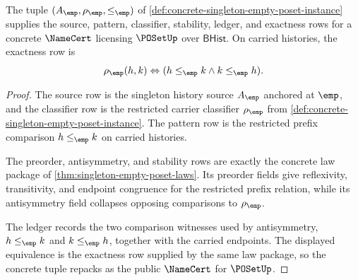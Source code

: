 \begin{theorem}
\label{thm:concrete-singleton-empty-poset-namecert}
The tuple $(A_{\emp},\rho_{\emp},\le_{\emp})$ of
\autoref{def:concrete-singleton-empty-poset-instance} supplies the source,
pattern, classifier, stability, ledger, and exactness rows for a concrete
$\NameCert$ licensing $\POSetUp$ over $\mathsf{BHist}$. On carried histories,
the exactness row is
$$
\rho_{\emp}(h,k)\Leftrightarrow(h\le_{\emp}k\land k\le_{\emp}h).
$$
\end{theorem}
\begin{proof}
The source row is the singleton history source $A_{\emp}$ anchored at $\emp$,
and the classifier row is the restricted carrier classifier $\rho_{\emp}$ from
\autoref{def:concrete-singleton-empty-poset-instance}. The pattern row is the
restricted prefix comparison $h\le_{\emp}k$ on carried histories.

The preorder, antisymmetry, and stability rows are exactly the concrete law
package of \autoref{thm:singleton-empty-poset-laws}. Its preorder fields give
reflexivity, transitivity, and endpoint congruence for the restricted prefix
relation, while its antisymmetry field collapses opposing comparisons to
$\rho_{\emp}$.

The ledger records the two comparison witnesses used by antisymmetry,
$h\le_{\emp}k$ and $k\le_{\emp}h$, together with the carried endpoints. The
displayed equivalence is the exactness row supplied by the same law package, so
the concrete tuple repacks as the public $\NameCert$ for $\POSetUp$.
\end{proof}

